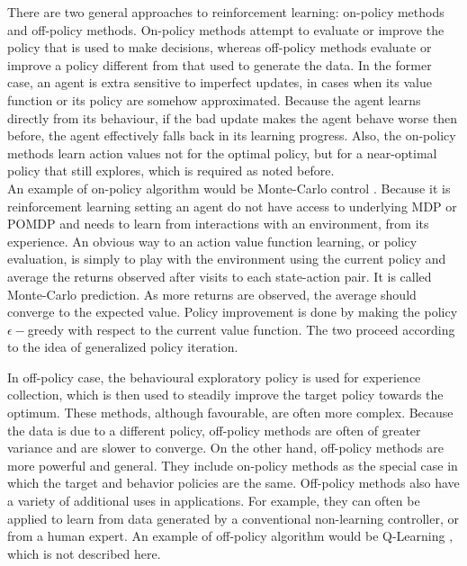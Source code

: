 There are two general approaches to reinforcement learning: on-policy methods and off-policy methods. On-policy methods attempt to evaluate or improve the policy that is used to make decisions, whereas off-policy methods evaluate or improve a policy different from that used to generate the data. In the former case, an agent is extra sensitive to imperfect updates, in cases when its value function or its policy are somehow approximated. Because the agent learns directly from its behaviour, if the bad update makes the agent behave worse then before, the agent effectively falls back in its learning progress. Also, the on-policy methods learn action values not for the optimal policy, but for a near-optimal policy that still explores, which is required as noted before. \\
An example of on-policy algorithm would be Monte-Carlo control \cite{Book.RLAI}. Because it is reinforcement learning setting an agent do not have access to underlying MDP or POMDP and needs to learn from interactions with an environment, from its experience. An obvious way to an action value function learning, or policy evaluation, is simply to play with the environment using the current policy and average the returns observed after visits to each state-action pair. It is called Monte-Carlo prediction. As more returns are observed, the average should converge to the expected value. Policy improvement is done by making the policy $\epsilon-$greedy with respect to the current value function. The two proceed according to the idea of generalized policy iteration.

In off-policy case, the behavioural exploratory policy is used for experience collection, which is then used to steadily improve the target policy towards the optimum. These methods, although favourable, are often more complex. Because the data is due to a different policy, off-policy methods are often of greater variance and are slower to converge. On the other hand, off-policy methods are more powerful and general. They include on-policy methods as the special case in which the target and behavior policies are the same. Off-policy methods also have a variety of additional uses in applications. For example, they can often be applied to learn from data generated by a conventional non-learning controller, or from a human expert. An example of off-policy algorithm would be Q-Learning \cite{Book.RLAI}, which is not described here.

